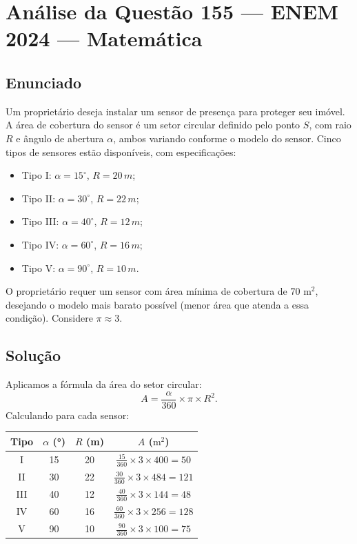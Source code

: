 \documentclass{article}
\begin{document}
\section*{Análise da Questão 155 — ENEM 2024 — Matemática}

\subsection*{Enunciado}
Um proprietário deseja instalar um sensor de presença para proteger seu imóvel. A área de cobertura do sensor é um setor circular definido pelo ponto \(S\), com raio \(R\) e ângulo de abertura \(\alpha\), ambos variando conforme o modelo do sensor. Cinco tipos de sensores estão disponíveis, com especificações:
\begin{itemize}
  \item Tipo I: \(\alpha = 15^\circ\), \(R = 20\,m\);
  \item Tipo II: \(\alpha = 30^\circ\), \(R = 22\,m\);
  \item Tipo III: \(\alpha = 40^\circ\), \(R = 12\,m\);
  \item Tipo IV: \(\alpha = 60^\circ\), \(R = 16\,m\);
  \item Tipo V: \(\alpha = 90^\circ\), \(R = 10\,m\).
\end{itemize}
O proprietário requer um sensor com área mínima de cobertura de 70 \(\mathrm{m}^2\), desejando o modelo mais barato possível (menor área que atenda a essa condição). Considere \(\pi \approx 3\).

\subsection*{Solução}
Aplicamos a fórmula da área do setor circular:
\[
A = \frac{\alpha}{360} \times \pi \times R^2.
\]
Calculando para cada sensor:

\begin{tabular}{c|c|c|c}
Tipo & $\alpha$ (°) & $R$ (m) & $A$ ($\mathrm{m}^2$) \\
\hline
I & 15 & 20 & $\frac{15}{360} \times 3 \times 400 = 50$ \\
II & 30 & 22 & $\frac{30}{360} \times 3 \times 484 = 121$ \\
III & 40 & 12 & $\frac{40}{360} \times 3 \times 144 = 48$ \\
IV & 60 & 16 & $\frac{60}{360} \times 3 \times 256 = 128$ \\
V & 90 & 10 & $\frac{90}{360} \times 3 \times 100 = 75$ \\
\end{tabular}
\end{document}
